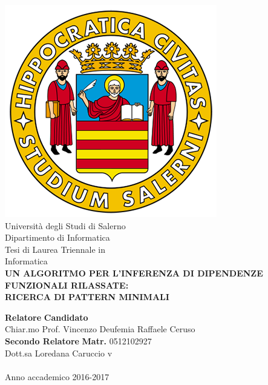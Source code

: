 \begin{center}
    \includegraphics[scale = 0.30]{Immagini/logoUnisa.png}\\
    \vspace{1cm}
    {\Large Università degli Studi di Salerno}\\[0.2truecm]
    {\large Dipartimento di Informatica}\\
    \hrulefill
    \vfill
    {\large Tesi di Laurea Triennale in }\\[0.2truecm]
    {\Large Informatica}\\
    \vfill
    {\large \bf UN ALGORITMO PER L'INFERENZA
    	DI DIPENDENZE FUNZIONALI RILASSATE:\\ 
        RICERCA DI PATTERN MINIMALI
    }
    \vfill\vfill
   
    
    {\bf Relatore} \hfill {\bf Candidato} 
    \\
    Chiar.mo Prof. Vincenzo Deufemia \hfill Raffaele Ceruso \\
    \vfill
    {\bf Secondo Relatore}
    \hfill {\bf Matr.} 0512102927\\
    
    
    Dott.sa Loredana Caruccio  \hfill {\phantom v} \\
    \vspace{1cm}
    \hrulefill \\
    \vspace{1cm}
    Anno accademico 2016-2017
   
\end{center}